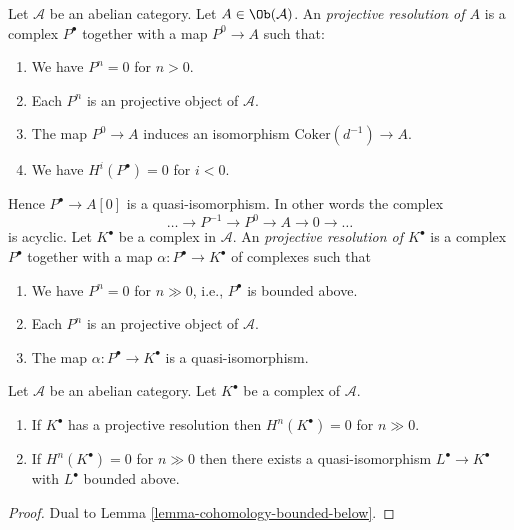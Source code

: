 \begin{definition}
\label{definition-projective-resolution}
Let $\mathcal{A}$ be an abelian category.
Let $A \in \Ob(\mathcal{A})$.
An {\it projective resolution of $A$} is a complex
$P^\bullet$ together with a map $P^0 \to A$ such
that:
\begin{enumerate}
\item We have $P^n = 0$ for $n > 0$.
\item Each $P^n$ is an projective object of $\mathcal{A}$.
\item The map $P^0 \to A$ induces an isomorphism $\text{Coker}(d^{-1}) \to A$.
\item We have $H^i(P^\bullet) = 0$ for $i < 0$.
\end{enumerate}
Hence $P^\bullet \to A[0]$ is a quasi-isomorphism.
In other words the complex
$$
\ldots \to P^{-1} \to P^0 \to A \to 0 \to \ldots
$$
is acyclic. Let $K^\bullet$ be a complex in $\mathcal{A}$.
An {\it projective resolution of $K^\bullet$} is a complex
$P^\bullet$ together with a map $\alpha : P^\bullet \to K^\bullet$
of complexes such that
\begin{enumerate}
\item We have $P^n = 0$ for $n \gg 0$, i.e., $P^\bullet$ is bounded above.
\item Each $P^n$ is an projective object of $\mathcal{A}$.
\item The map $\alpha : P^\bullet \to K^\bullet$ is a
quasi-isomorphism.
\end{enumerate}
\end{definition}

\begin{lemma}
\label{lemma-cohomology-bounded-above}
Let $\mathcal{A}$ be an abelian category.
Let $K^\bullet$ be a complex of $\mathcal{A}$.
\begin{enumerate}
\item If $K^\bullet$ has a projective resolution then
$H^n(K^\bullet) = 0$ for $n \gg 0$.
\item If $H^n(K^\bullet) = 0$ for $n \gg 0$ then there
exists a quasi-isomorphism $L^\bullet \to K^\bullet$
with $L^\bullet$ bounded above.
\end{enumerate}
\end{lemma}

\begin{proof}
Dual to
Lemma \ref{lemma-cohomology-bounded-below}.
\end{proof}


